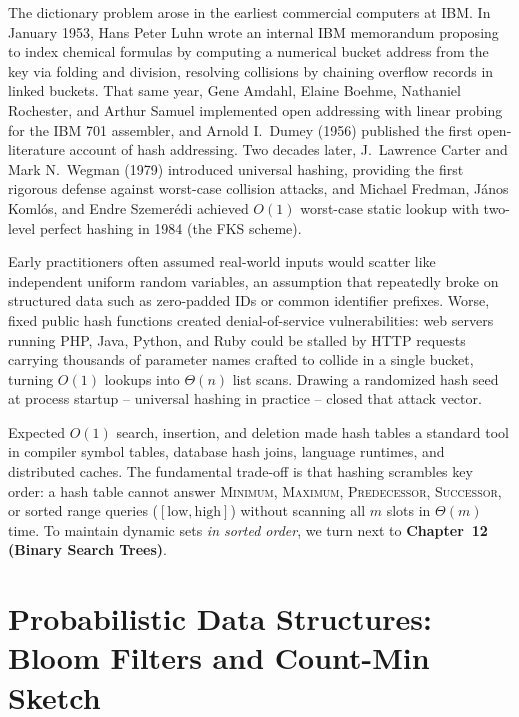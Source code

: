 \begin{historybox}
The dictionary problem arose in the earliest commercial computers at IBM. In January 1953, Hans Peter Luhn wrote an internal IBM memorandum proposing to index chemical formulas by computing a numerical bucket address from the key via folding and division, resolving collisions by chaining overflow records in linked buckets. That same year, Gene Amdahl, Elaine Boehme, Nathaniel Rochester, and Arthur Samuel implemented open addressing with linear probing for the IBM 701 assembler, and Arnold I.~Dumey (1956) published the first open-literature account of hash addressing. Two decades later, J.~Lawrence Carter and Mark N.~Wegman (1979) introduced universal hashing, providing the first rigorous defense against worst-case collision attacks, and Michael Fredman, J\'anos Koml\'os, and Endre Szemer\'edi achieved $O(1)$ worst-case static lookup with two-level perfect hashing in 1984 (the FKS scheme).

Early practitioners often assumed real-world inputs would scatter like independent uniform random variables, an assumption that repeatedly broke on structured data such as zero-padded IDs or common identifier prefixes. Worse, fixed public hash functions created denial-of-service vulnerabilities: web servers running PHP, Java, Python, and Ruby could be stalled by HTTP requests carrying thousands of parameter names crafted to collide in a single bucket, turning $O(1)$ lookups into $\Theta(n)$ list scans. Drawing a randomized hash seed at process startup -- universal hashing in practice -- closed that attack vector.

Expected $O(1)$ search, insertion, and deletion made hash tables a standard tool in compiler symbol tables, database hash joins, language runtimes, and distributed caches. The fundamental trade-off is that hashing scrambles key order: a hash table cannot answer \textsc{Minimum}, \textsc{Maximum}, \textsc{Predecessor}, \textsc{Successor}, or sorted range queries ($[\text{low}, \text{high}]$) without scanning all $m$ slots in $\Theta(m)$ time. To maintain dynamic sets \emph{in sorted order}, we turn next to \textbf{Chapter~12 (Binary Search Trees)}.
\end{historybox}

\section{Probabilistic Data Structures: Bloom Filters and Count-Min Sketch}
\label{ch11:probabilistic}

